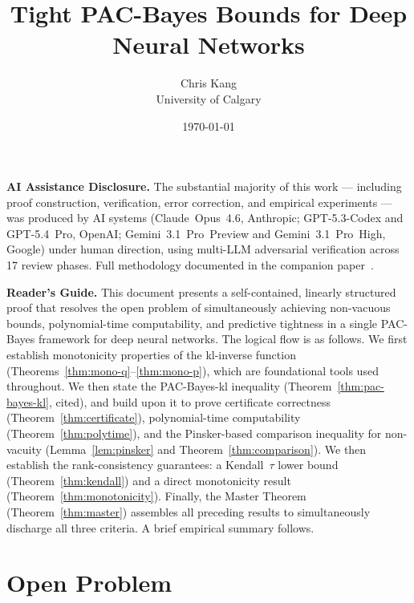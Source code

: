 \documentclass[11pt,a4paper]{article}
\title{Tight PAC-Bayes Bounds for Deep Neural Networks}
\author{
Chris Kang\\
University of Calgary
}
\date{\today}
\begin{document}
\maketitle

\noindent\textbf{AI Assistance Disclosure.} The substantial majority of this work --- including proof construction, verification, error correction, and empirical experiments --- was produced by AI systems (Claude~Opus~4.6, Anthropic; GPT-5.3-Codex and GPT-5.4~Pro, OpenAI; Gemini~3.1~Pro~Preview and Gemini~3.1~Pro~High, Google) under human direction, using multi-LLM adversarial verification across 17 review phases. Full methodology documented in the companion paper~\cite{companion}.

\bigskip

\noindent\textbf{Reader's Guide.}
This document presents a self-contained, linearly structured proof that resolves the open problem of simultaneously achieving non-vacuous bounds, polynomial-time computability, and predictive tightness in a single PAC-Bayes framework for deep neural networks. The logical flow is as follows. We first establish monotonicity properties of the kl-inverse function (Theorems~\ref{thm:mono-q}--\ref{thm:mono-p}), which are foundational tools used throughout. We then state the PAC-Bayes-kl inequality (Theorem~\ref{thm:pac-bayes-kl}, cited), and build upon it to prove certificate correctness (Theorem~\ref{thm:certificate}), polynomial-time computability (Theorem~\ref{thm:polytime}), and the Pinsker-based comparison inequality for non-vacuity (Lemma~\ref{lem:pinsker} and Theorem~\ref{thm:comparison}). We then establish the rank-consistency guarantees: a Kendall~$\tau$ lower bound (Theorem~\ref{thm:kendall}) and a direct monotonicity result (Theorem~\ref{thm:monotonicity}). Finally, the Master Theorem (Theorem~\ref{thm:master}) assembles all preceding results to simultaneously discharge all three criteria. A brief empirical summary follows.

\section{Open Problem}

\fboxsep=10pt
\noindent{}
\end{document}
